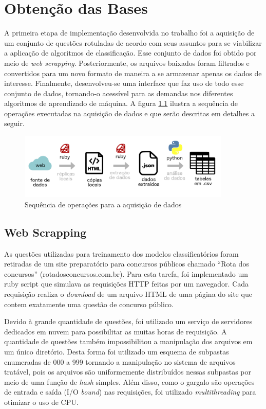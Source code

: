 \chapter{Obtenção das Bases}
\label{chapter:ObtencaoBases}
\noindent

A primeira etapa de implementação desenvolvida no trabalho foi a aquisição de um conjunto de questões rotuladas de acordo com seus assuntos para se viabilizar a aplicação de algoritmos de classificação. Esse conjunto de dados foi obtido por meio de \textit{web scrapping}. Posteriormente, os arquivos baixados foram filtrados e convertidos para um novo formato de maneira a se armazenar apenas os dados de interesse. Finalmente, desenvolveu-se uma interface que faz uso de todo esse conjunto de dados, tornando-o acessível para as demandas nos diferentes algoritmos de aprendizado de máquina. A figura \ref{fig:data_processing_pipeline} ilustra a sequência de operações executadas na aquisição de dados e que serão descritas em detalhes a seguir.

\begin{figure}[!ht]
	\centering
	\includegraphics[width=0.9\textwidth]{figures/data_processing_pipeline.PNG}
	\caption{Sequência de operações para a aquisição de dados}
	\label{fig:data_processing_pipeline}
\end{figure}

\section{Web Scrapping}

As questões utilizadas para treinamento dos modelos classificatórios foram retiradas de um site preparatório para concursos públicos chamado “Rota dos concursos” (rotadosconcursos.com.br). Para esta tarefa, foi implementado um ruby script que simulava as requisições HTTP feitas por um navegador. Cada requisição realiza o \textit{download} de um arquivo HTML de uma página do site que contem exatamente uma questão de concurso público.

Devido à grande quantidade de questões, foi utilizado um serviço de servidores dedicados em nuvem para possibilitar as muitas horas de requisição. A quantidade de questões também impossibilitou a manipulação dos arquivos em um único diretório. Desta forma foi utilizado um esquema de subpastas enumeradas de 000 a 999 tornando a manipulação no sistema de arquivos tratável, pois os arquivos são uniformemente distribuídos nessas subpastas por meio de uma função de \textit{hash} simples. Além disso, como o gargalo são operações de entrada e saída (I/O \textit{bound}) nas requisições, foi utilizado \textit{multithreading} para otimizar o uso de CPU.
    
